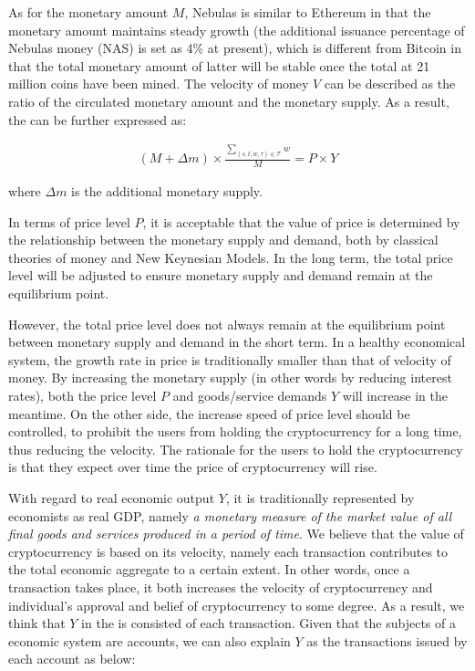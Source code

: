 As for the monetary amount $M$, Nebulas is similar to Ethereum in that the
monetary amount maintains steady growth (the additional issuance percentage of
Nebulas money (NAS) is set as 4\% at present), which is different from Bitcoin
in that the total monetary amount of latter will be stable once the total at 21
million coins have been mined. The velocity of money $V$ can be described as
the ratio of the circulated monetary amount and the monetary supply. As a
result, the  can be further expressed as:

\begin{align}
(M + \Delta{m}) \times \frac{\sum_{(s, t, w, \tau)\in \mathcal{T}}{w}}{M} = P \times Y
\label{eq:cur_ext}
\end{align}

\noindent where $\Delta{m}$ is the additional monetary supply.

In terms of price level $P$, it is acceptable that the value of price is determined by the relationship between the monetary supply and demand, both by classical theories of money and New Keynesian Models. In the long term, the total price level will be adjusted to ensure monetary supply and demand remain at the equilibrium point.

However, the total price level does not always remain at the equilibrium point between monetary supply and demand in the short term. In a healthy economical system, the growth rate in price is traditionally smaller than that of velocity of money. By increasing the monetary supply (in other words by reducing interest rates), both the price level $P$ and goods/service demands $Y$ will increase in the meantime. On the other side, the increase speed of price level should be controlled, to prohibit the users from holding the cryptocurrency for a long time, thus reducing the velocity. The rationale for the users to hold the cryptocurrency is that they expect over time the price of cryptocurrency will rise.


With regard to real economic output $Y$, it is traditionally represented by
economists as real GDP, namely \emph{a monetary measure of the market value of
all final goods and services produced in a period of time}. We believe that the
value of cryptocurrency is based on its velocity, namely each transaction
contributes to the total economic aggregate to a certain extent. In other
words, once a transaction takes place, it both increases the velocity of
cryptocurrency and individual's approval and belief of cryptocurrency to some
degree. As a result, we think that $Y$ in the  is consisted of each transaction. Given that the subjects of a economic system are accounts, we can also explain $Y$ as the transactions issued by each account as below:

